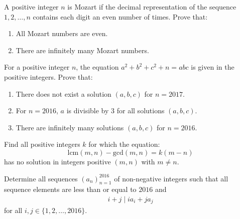 \documentclass[problems.tex]{subfile}
\begin{document}
	\begin{problem}
		A positive integer $n$ is Mozart if the decimal representation of the sequence $1, 2, \ldots, n$ contains each digit an even number of times.
		Prove that:
		\begin{enumerate}
			\item All Mozart numbers are even.
			\item There are infinitely many Mozart numbers.
		\end{enumerate}
	\end{problem}

	\begin{problem}
		For a positive integer $n$, the equation $a^2 + b^2 + c^2 + n = abc$ is given in the positive integers.
		Prove that:
		\begin{enumerate}
			\item There does not exist a solution $(a, b, c)$ for $n = 2017$.
			\item For $n = 2016$, $a$ is divisible by $3$ for all solutions $(a, b, c)$.
			\item There are infinitely many solutions $(a, b, c)$ for $n = 2016$.
		\end{enumerate}
	\end{problem}

	\begin{problem}
		Find all positive integers $k$ for which the equation: $$ \text{lcm}(m,n)-\text{gcd}(m,n)=k(m-n)$$has no solution in integers positive $(m,n)$ with $m\neq n$. %
	\end{problem}

	\begin{problem}
		Determine all sequences $(a_n)_{n=1}^{2016}$ of non-negative integers such that all sequence elements are less than or equal to $2016$ and
		\begin{align*}
			i+j \mid ia_i + ja_j
		\end{align*}
		for all $i,j \in \{1, 2, \dots, 2016\}$.
	\end{problem}
\end{document}
